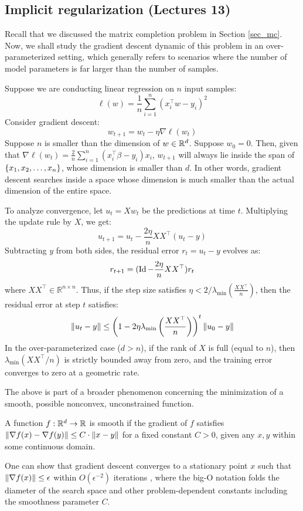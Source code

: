\subsection{Implicit regularization (Lectures 13)}

Recall that we discussed the matrix completion problem in Section \ref{sec_mc}.
Now, we shall study the gradient descent dynamic of this problem in an over-parameterized setting, which generally refers to scenarios where the number of model parameters is far larger than the number of samples.

\begin{example}
Suppose we are conducting linear regression on $n$ input samples:
\[ \ell(w) = \frac 1 n \sum_{i=1}^n (x_i^{\top} w - y_i)^2 \]
Consider gradient descent:
\[ w_{t+1} = w_t - \eta \nabla \ell(w_t) \]
Suppose $n$ is smaller than the dimension of $w \in \mathbb{R}^d$.
Suppose $w_0 = 0$.
Then, given that $\nabla \ell(w_t) = \frac 2 n\sum_{i=1}^n (x_i^{\top} \beta - y_i) x_i$, $w_{t+1}$ will always lie inside the span of $\left\{x_1, x_2, \dots, x_n\right\}$, whose dimension is smaller than $d$.
In other words, gradient descent searches inside a space whose dimension is much smaller than the actual dimension of the entire space.

To analyze convergence, let $u_t = Xw_t$ be the predictions at time $t$. Multiplying the update rule by $X$, we get:
\[ u_{t+1} = u_t - \frac{2\eta} n XX^\top(u_t - y) \]
Subtracting $y$ from both sides, the residual error $r_t = u_t - y$ evolves as:
\[ r_{t+1} = (\operatorname{Id} - \frac {2\eta} n XX^{\top})r_t \]
where $XX^\top \in \mathbb{R}^{n \times n}$.
Thus, if the step size satisfies $\eta < 2/\lambda_{\min}(\frac {X X^{\top}} n)$, then the residual error at step $t$ satisfies:
\[ \left\| u_t - y \right\| \le \left(1 -  {2\eta} \lambda_{\min}\left(\frac {XX^{\top}} n\right)\right)^{t} \left\| u_0 - y \right\| \]
In the over-parameterized case ($d > n$), if the rank of $X$ is full (equal to $n$), then $\lambda_{\min}(XX^{\top} / n)$ is strictly bounded away from zero, and the training error converges to zero at a geometric rate.
\end{example}

\begin{example}
    The above is part of a broader phenomenon concerning the minimization of a smooth, possible nonconvex, unconstrained function.

    A function $f: \mathbb{R}^d \rightarrow \mathbb{R}$ is smooth if the gradient of $f$ satisfies $\left\| \nabla f(x) - \nabla f(y) \right\| \le C \cdot \left\| x - y \right\|$ for a fixed constant $C > 0$, given any $x, y$ within some continuous domain.

    One can show that gradient descent converges to a stationary point $x$ such that $\left\| \nabla f(x) \right\| \le \epsilon$ within $O(\epsilon^{-2})$ iterations \citep{ghadimi2013stochastic}, where the big-O notation folds the diameter of the search space and other problem-dependent constants including the smoothness parameter $C$.
\end{example}

